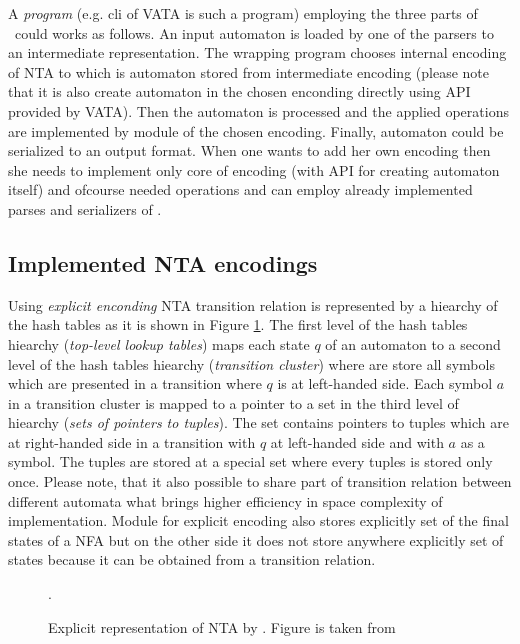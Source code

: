 A \emph{program} (e.g. cli of VATA is such a program) employing the three parts of \vata\ could works as follows.
An input automaton is loaded by one of the parsers to an intermediate representation.
The wrapping program chooses internal encoding of NTA to which is automaton stored from intermediate encoding (please note that it is also
create automaton in the chosen enconding directly using API provided by VATA).
Then the automaton is processed and the applied operations are implemented by module of the chosen encoding.
Finally, automaton could be serialized to an output format.
When one wants to add her own encoding then she needs to implement only core of encoding (with API for creating automaton itself)
and ofcourse needed operations and can employ already implemented parses and serializers of \vata.

\subsection{Implemented NTA encodings}

Using \emph{explicit enconding} NTA transition relation is represented by a hiearchy of the hash tables as it is shown in Figure \ref{fig:explnta}.
The first level of the hash tables hiearchy (\emph{top-level lookup tables}) maps each state $q$ of an automaton to 
a second level of the hash tables hiearchy (\emph{transition cluster}) where are store all symbols which
are presented in a transition where $q$ is at left-handed side.
Each symbol $a$ in a transition cluster is mapped to a pointer to a set in the third level of hiearchy (\emph{sets of pointers to tuples}).
The set contains pointers to tuples which are at right-handed side in a transition with $q$ at left-handed side and with $a$ as a symbol.
The tuples are stored at a special set where every tuples is stored only once.
Please note, that it also possible to share part of transition relation between different automata what
brings higher efficiency in space complexity of implementation.
Module for explicit encoding also stores explicitly set of the final states of a NFA but on
the other side it does not store anywhere explicitly set of states because it can be obtained from a transition relation.

\begin{figure}[bt]
\begin{center}

	\caption{Explicit representation of NTA by \vata. Figure is taken from \cite{tacas12}}.
	\label{fig:explnta}
\end{center}
\end{figure}

